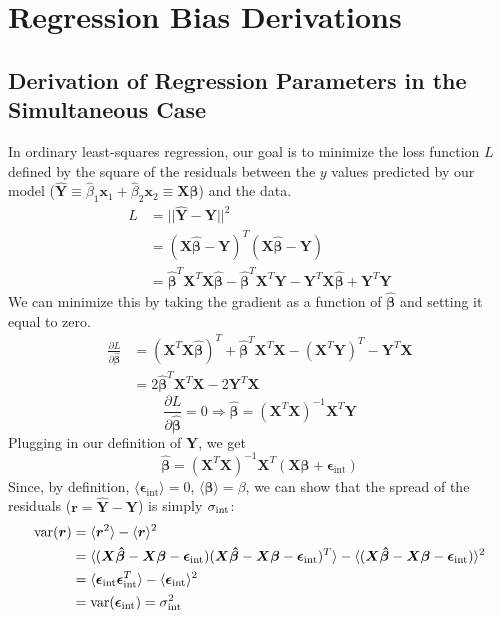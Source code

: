 \chapter{Regression Bias Derivations}
\section{Derivation of Regression Parameters in the Simultaneous Case}
\label{app:simultaneous_ols}
In ordinary least-squares regression, our goal is to minimize the loss function $L$ defined by the square of the residuals between the $y$ values predicted by our model ($\hat{\bm{Y}}\equiv\hat{\beta}_1\bm{x}_1 +\hat{\beta}_2\bm{x}_2\equiv\bm{X\hat{\beta}}$) and the data. 
\begin{align*}
    L &= ||\hat{\bm{Y}}-\bm{Y}||^2\\
    &= (\bm{X\hat{\beta}}-\bm{Y})^T(\bm{X\hat{\beta}}-\bm{Y})\\
    &= \bm{\hat{\beta}}^T\bm{X}^T\bm{X\hat{\beta}}
    - \bm{\hat{\beta}}^T\bm{X}^T\bm{Y}
    - \bm{Y}^T\bm{X\hat{\beta}}
    + \bm{Y}^T\bm{Y}
\end{align*}
We can minimize this by taking the gradient as a function of $\bm{\hat{\beta}}$ and setting it equal to zero.
\begin{align*}
    \frac{\partial L}{\partial\bm{\hat{\beta}}} &=
    (\bm{X}^T\bm{X}\bm{\hat{\beta}})^T
    + \bm{\hat{\beta}}^T\bm{X}^T\bm{X}
    - (\bm{X}^T\bm{Y})^T
    - \bm{Y}^T\bm{X}\\
    &= 2\bm{\hat{\beta}}^T\bm{X}^T\bm{X} - 2\bm{Y}^T\bm{X}
\end{align*}
$$\frac{\partial L}{\partial\bm{\hat{\beta}}} = 0 \Rightarrow \bm{\hat{\beta}}=(\bm{X}^T\bm{X})^{-1}\bm{X}^T\bm{Y}$$
Plugging in our definition of $\bm{Y}$, we get
\begin{equation}
    \bm{\hat{\beta}} = (\bm{X}^T\bm{X})^{-1}\bm{X}^T(\bm{X\beta} + \bm{\epsilon}_\text{int})
\label{eqn:sim_beta_vec_app}
\end{equation}
Since, by definition, $\langle\bm{\epsilon}_\text{int}\rangle=0$, $\langle\bm{\hat{\beta}}\rangle = \beta$, we can show that the spread of the residuals ($\bm{r}=\bm{\hat{Y}}-\bm{Y}$) is simply $\sigma_{\text{int}}$:
\begin{align*}
    \text{var}(\bm{r}) &= \langle\bm{r}^2\rangle - \langle\bm{r}\rangle^2\\
    &= \langle(\bm{X\hat{\beta}}-\bm{X\beta}-\bm{\epsilon}_\text{int})(\bm{X\hat{\beta}}-\bm{X\beta}-\bm{\epsilon}_\text{int})^T\rangle - \langle(\bm{X\hat{\beta}}-\bm{X\beta}-\bm{\epsilon}_\text{int})\rangle^2\\
    &= \langle\bm{\epsilon}_\text{int}\bm{\epsilon}_\text{int}^T\rangle - \langle\bm{\epsilon}_\text{int}\rangle^2\\
    &= \text{var}(\bm{\epsilon}_\text{int}) = \sigma_{\text{int}}^2
\end{align*}

